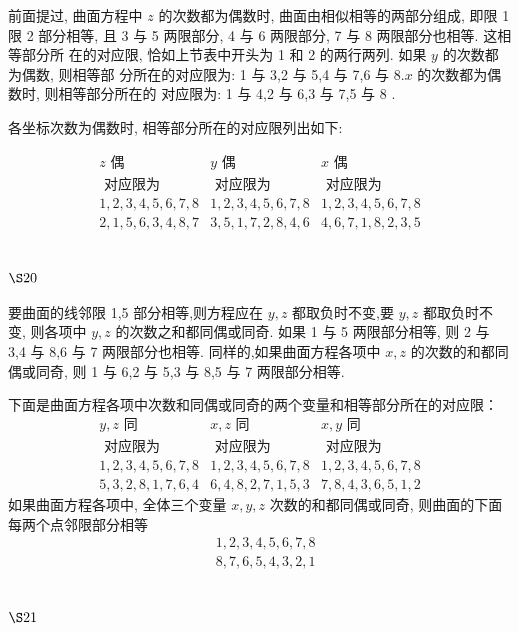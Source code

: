 前面提过, 曲面方程中 $z$ 的次数都为偶数时, 曲面由相似相等的两部分组成, 即限 1 限 2 部分相等, 且 3 与 5 两限部分, 4 与 6 两限部分, 7 与 8 两限部分也相等. 这相等部分所 在的对应限, 恰如上节表中开头为 1 和 2 的两行两列. 如果 $y$ 的次数都为偶数, 则相等部 分所在的对应限为: 1 与 3,2 与 5,4 与 7,6 与 $8 . x$ 的次数都为偶数时, 则相等部分所在的 对应限为: 1 与 4,2 与 6,3 与 7,5 与 8 .

各坐标次数为偶数时, 相等部分所在的对应限列出如下:


\[
\begin{array}{c|c|c}
z \text { 偶 } & y \text { 偶 } & x \text { 偶 } \\
\text { 对应限为 } & \text { 对应限为 } & \text { 对应限为 } \\
\hline 1,2,3,4,5,6,7,8 & 1,2,3,4,5,6,7,8 & 1,2,3,4,5,6,7,8 \\
2,1,5,6,3,4,8,7 & 3,5,1,7,2,8,4,6 & 4,6,7,1,8,2,3,5
\end{array}
\]

\section{$\S 20$}

要曲面的线邻限 1,5 部分相等,则方程应在 $y, z$ 都取负时不变,要 $y, z$ 都取负时不 变, 则各项中 $y, z$ 的次数之和都同偶或同奇. 如果 1 与 5 两限部分相等, 则 2 与 3,4 与 8,6 与 7 两限部分也相等. 同样的,如果曲面方程各项中 $x, z$ 的次数的和都同偶或同奇, 则 1 与 6,2 与 5,3 与 8,5 与 7 两限部分相等.

下面是曲面方程各项中次数和同偶或同奇的两个变量和相等部分所在的对应限：
\[
\begin{array}{c|c|c}
y, z \text { 同 } & x, z \text { 同 } & x, y \text { 同 } \\
\text { 对应限为 } & \text { 对应限为 } & \text { 对应限为 } \\
1,2,3,4,5,6,7,8 & 1,2,3,4,5,6,7,8 & 1,2,3,4,5,6,7,8 \\
5,3,2,8,1,7,6,4 & 6,4,8,2,7,1,5,3 & 7,8,4,3,6,5,1,2
\end{array}
\]
如果曲面方程各项中, 全体三个变量 $x, y, z$ 次数的和都同偶或同奇, 则曲面的下面 每两个点邻限部分相等
\[
\begin{aligned}
& 1,2,3,4,5,6,7,8 \\
& 8,7,6,5,4,3,2,1
\end{aligned}
\]
\section{$\S 21$}

